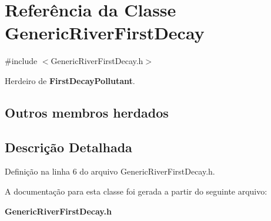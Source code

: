 \section{Referência da Classe Generic\+River\+First\+Decay}
\label{class_generic_river_first_decay}


{\ttfamily \#include $<$Generic\+River\+First\+Decay.\+h$>$}



Herdeiro de {\bf First\+Decay\+Pollutant}.

\subsection*{Outros membros herdados}


\subsection{Descrição Detalhada}


Definição na linha 6 do arquivo Generic\+River\+First\+Decay.\+h.



A documentação para esta classe foi gerada a partir do seguinte arquivo\+:\begin{DoxyCompactItemize}
\item 
{\bf Generic\+River\+First\+Decay.\+h}\end{DoxyCompactItemize}
